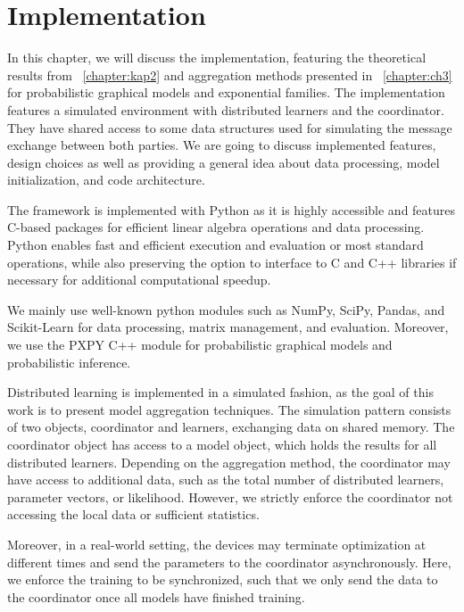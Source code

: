 
\chapter{Implementation}
\label{chapter:ch4}
In this chapter, we will discuss the implementation, featuring the theoretical results from \chap~\ref{chapter:kap2} and aggregation methods presented in \chap~\ref{chapter:ch3} for probabilistic graphical models and exponential families.
The implementation features a simulated environment with distributed learners and the coordinator.
They have shared access to some data structures used for simulating the message exchange between both parties.
We are going to discuss implemented features, design choices as well as providing a general idea about data processing, model initialization, and code architecture.

The framework is implemented with Python as it is highly accessible and features C-based packages for efficient linear algebra operations and data processing.
Python enables fast and efficient execution and evaluation or most standard operations, while also preserving the option to interface to C and C++ libraries if necessary for additional computational speedup.

We mainly use well-known python modules such as NumPy, SciPy, Pandas, and Scikit-Learn for data processing, matrix management, and evaluation.
Moreover, we use the PXPY C++ module for probabilistic graphical models and probabilistic inference.

Distributed learning is implemented in a simulated fashion, as the goal of this work is to present model aggregation techniques.
The simulation pattern consists of two objects, coordinator and learners, exchanging data on shared memory. 
The coordinator object has access to a model object, which holds the results for all distributed learners.
Depending on the aggregation method, the coordinator may have access to additional data, such as the total number of distributed learners, parameter vectors, or likelihood. 
However, we strictly enforce the coordinator not accessing the local data or sufficient statistics.

Moreover, in a real-world setting, the devices may terminate optimization at different times and send the parameters to the coordinator asynchronously. 
Here, we enforce the training to be synchronized, such that we only send the data to the coordinator once all models have finished training.

